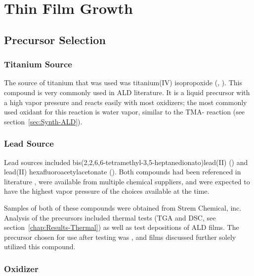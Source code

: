 \chapter{Thin Film Growth}
\label{ch:SampFab}
\thispagestyle{empty}



\section{Precursor Selection}
\label{sec:SampFab-Precursors}

\lipsum

\subsection{Titanium Source}

The source of titanium that was used was titanium(IV) isopropoxide (\TiOiPr{}, ). This compound is very commonly used in ALD literature. It is a liquid precursor with a high vapor pressure and reacts easily with most oxidizers; the most commonly used oxidant for this reaction is water vapor, similar to the TMA- reaction (see section~\vref{sec:Synth-ALD}). 

\subsection{Lead Source}

Lead sources included bis(2,2,6,6-tetramethyl-3,5-heptanedionato)lead(II) () and lead(II) hexafluoroacetylacetonate (). Both compounds had been referenced in literature , were available from multiple chemical suppliers, and were expected to have the highest vapor pressure of the choices available at the time. 

Samples of both of these compounds were obtained from Strem Chemical, inc.  Analysis of the precursors included thermal tests (TGA and DSC, see section~\vref{chap:Results-Thermal}) as well as test depositions of ALD films. The precursor chosen for use after testing was \TMHD{}, and films discussed further solely utilized this compound. 

\subsection{Oxidizer}

